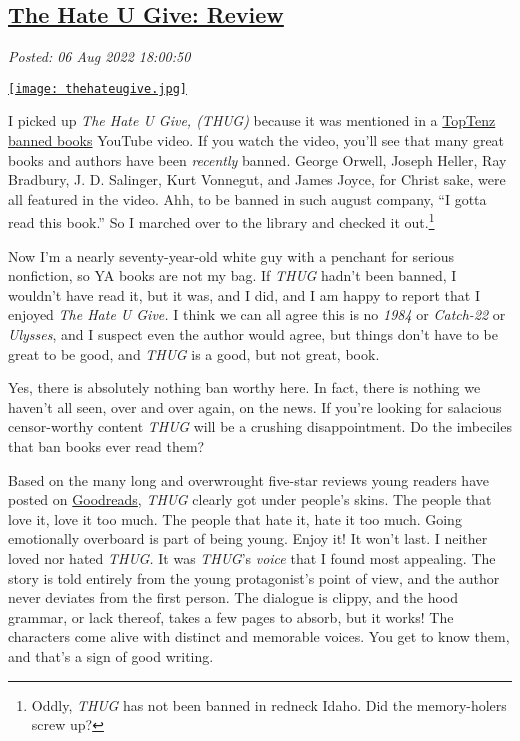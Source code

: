 %

\subsection*{\href{http://analyzethedatanotthedrivel.org/2022/08/06/the-hate-u-give-review/}{The Hate U Give: Review}}


\noindent\emph{Posted: 06 Aug 2022 18:00:50}
\vspace{6pt}


\captionsetup[floatingfigure]{labelformat=empty}
\begin{floatingfigure}[l]{0.21\textwidth}
\centering
\href{https://www.goodreads.com/book/show/58651625-the-hate-u-give}{\texttt{[image: thehateugive.jpg]}}
\label{fig:7452x0}
\end{floatingfigure}  I picked up \emph{The Hate U Give, (THUG)} because it was mentioned in a
\href{https://www.youtube.com/watch?v=5Gcfi-0vPAM}{TopTenz banned books} YouTube 
video. If you watch the video, you'll see that
many great books and authors have been \emph{recently} banned. George
Orwell, Joseph Heller, Ray Bradbury, J. D. Salinger, Kurt Vonnegut, and
James Joyce, for Christ sake, were all featured in the video. Ahh, to be
banned in such august company, ``I gotta read this book.'' So I marched
over to the library and checked it
out.\footnote{Oddly, \emph{THUG} has not been banned in redneck Idaho. Did the
  memory-holers screw up?}

Now I'm a nearly seventy-year-old white guy with a penchant for serious
nonfiction, so YA books are not my bag. If \emph{THUG} hadn't been
banned, I wouldn't have read it, but it was, and I did, and I am happy
to report that I enjoyed \emph{The Hate U Give.} I think we can all
agree this is no \emph{1984} or \emph{Catch-22} or \emph{Ulysses}, and I
suspect even the author would agree, but things don't have to be great
to be good, and \emph{THUG} is a good, but not great, book.

Yes, there is absolutely nothing ban worthy here. In fact, there is
nothing we haven't all seen, over and over again, on the news. If you're
looking for salacious censor-worthy content \emph{THUG} will be a
crushing disappointment. Do the imbeciles that ban books ever read them?

Based on the many long and overwrought five-star reviews young readers
have posted on
\href{https://www.goodreads.com/book/show/58651625-the-hate-u-give}{Goodreads},
\emph{THUG} clearly got under people's skins. The people that love it,
love it too much. The people that hate it, hate it too much. Going
emotionally overboard is part of being young. Enjoy it! It won't last. I
neither loved nor hated \emph{THUG.} It was \emph{THUG}'s \emph{voice}
that I found most appealing. The story is told entirely from the young
protagonist's point of view, and the author never deviates from the
first person. The dialogue is clippy, and the hood grammar, or lack
thereof, takes a few pages to absorb, but it works! The characters come
alive with distinct and memorable voices. You get to know them, and
that's a sign of good writing.

